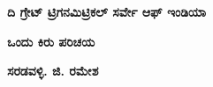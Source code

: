 \thispagestyle{empty}

\textbf{ದಿ ಗ್ರೇಟ್ ಟ್ರಿಗನಮಿಟ್ರಿಕಲ್​ ಸರ್ವೇ ಆಫ್​ ಇಂಡಿಯಾ}

\begin{center}
\textbf{ಒಂದು ಕಿರು ಪರಿಚಯ}
\end{center}

\textbf{ಸರಡವಳ್ಳಿ. ಜಿ. ರಮೇಶ}

